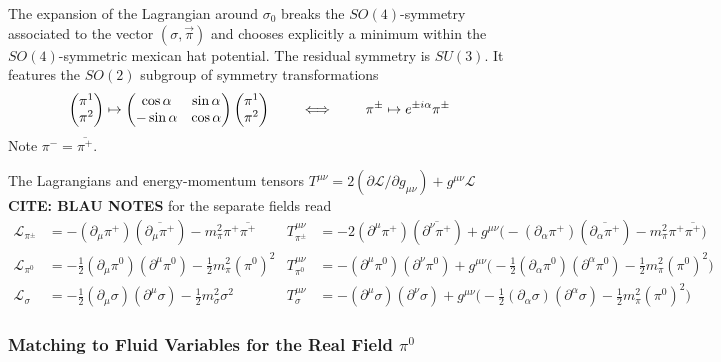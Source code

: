 The expansion of the Lagrangian around $\sigma_0$ breaks the $SO(4)$-symmetry associated to the vector $(\sigma,\vec{\pi})$ and chooses explicitly a minimum within the $SO(4)$-symmetric mexican hat potential. The residual symmetry is $SU(3)$. It features the $SO(2)$ subgroup of symmetry transformations
\begin{equation}
    \begin{pmatrix}
        \pi^1\\\pi^2
    \end{pmatrix}
        \mapsto
        \begin{pmatrix}
            \cos\alpha&\sin\alpha\\-\sin\alpha&\cos\alpha
        \end{pmatrix}
        \begin{pmatrix}
            \pi^1\\\pi^2
        \end{pmatrix}
        \qquad\iff\qquad\pi^\pm\mapsto e^{\pm{i}\alpha}\pi^\pm
\end{equation}
Note $\pi^-=\overline{\pi^+}$.

The Lagrangians and energy-momentum tensors $T^{\mu\nu}=2(\partial\mathscr{L}/\partial g_{\mu\nu})+g^{\mu\nu}\mathscr{L}$ \textbf{CITE: BLAU NOTES} for the separate fields read
\begin{subequations}
    \begin{align}
        \mathscr{L}_{\pi^\pm}&=-(\partial_\mu\pi^+)(\overline{\partial_\mu\pi^+})-m_\pi^2\pi^+\overline{\pi^+}&T^{\mu\nu}_{\pi^\pm}&=-2(\partial^\mu\pi^+)(\overline{\partial^\nu\pi^+})+g^{\mu\nu}\big(-(\partial_\alpha\pi^+)(\overline{\partial_\alpha\pi^+})-m_\pi^2\pi^+\overline{\pi^+}\big)\\
        \mathscr{L}_{\pi^0}&=-\frac{1}{2}(\partial_\mu\pi^0)(\partial^\mu\pi^0)-\frac{1}{2}m_\pi^2(\pi^0)^2&T^{\mu\nu}_{\pi^0}&=-(\partial^\mu\pi^0)(\partial^\nu\pi^0)+g^{\mu\nu}\big(-\frac{1}{2}(\partial_\alpha\pi^0)(\partial^\alpha\pi^0)-\frac{1}{2}m_\pi^2(\pi^0)^2\big)\\
        \mathscr{L}_\sigma&=-\frac{1}{2}(\partial_\mu\sigma)(\partial^\mu\sigma)-\frac{1}{2}m_\sigma^2\sigma^2&T^{\mu\nu}_{\sigma}&=-(\partial^\mu\sigma)(\partial^\nu\sigma)+g^{\mu\nu}\big(-\frac{1}{2}(\partial_\alpha\sigma)(\partial^\alpha\sigma)-\frac{1}{2}m_\pi^2(\pi^0)^2\big)
    \end{align}
\end{subequations}

\subsubsection{Matching to Fluid Variables for the Real Field $\pi^0$}


